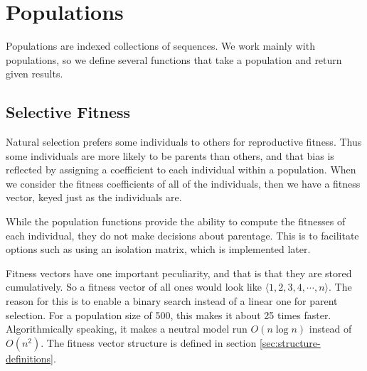 \documentclass{article}
\begin{document}
  \section{Populations}
    \label{sec:populations}

    Populations are indexed collections of sequences. We work mainly with
    populations, so we define several functions that take a population and
    return given results.

    \subsection{Selective Fitness}

      Natural selection prefers some individuals to others for reproductive
      fitness.  Thus some individuals are more likely to be parents than others,
      and that bias is reflected by assigning a coefficient to each individual
      within a population.  When we consider the fitness coefficients of all of
      the individuals, then we have a fitness vector, keyed just as the
      individuals are.

      While the population functions provide the ability to compute the
      fitnesses of each individual, they do not make decisions about parentage.
      This is to facilitate options such as using an isolation matrix, which is
      implemented later.

      Fitness vectors have one important peculiarity, and that is that they are
      stored cumulatively. So a fitness vector of all ones would look like
      $\langle 1, 2, 3, 4, \cdots, n \rangle$. The reason for this is to enable
      a binary search instead of a linear one for parent selection. For a
      population size of 500, this makes it about 25 times faster.
      Algorithmically speaking, it makes a neutral model run $O(n \log n)$
      instead of $O(n^2)$. The fitness vector structure is defined in section
      \ref{sec:structure-definitions}.
\end{document}
